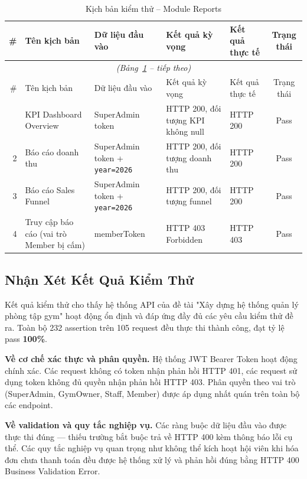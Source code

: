 \begin{longtable}{r p{3.2cm} p{2.8cm} p{2.8cm} p{2cm} c}
\caption{Kịch bản kiểm thử – Module Reports}
\label{tab:tc-reports} \\
\toprule
\# & Tên kịch bản & Dữ liệu đầu vào & Kết quả kỳ vọng & Kết quả thực tế & Trạng thái \\
\midrule
\endfirsthead
\multicolumn{6}{c}{\textit{(Bảng~\ref{tab:tc-reports} – tiếp theo)}} \\ \toprule
\# & Tên kịch bản & Dữ liệu đầu vào & Kết quả kỳ vọng & Kết quả thực tế & Trạng thái \\ \midrule
\endhead \midrule \endfoot \bottomrule \endlastfoot
1 & KPI Dashboard Overview                & SuperAdmin token                     & HTTP 200, đối tượng KPI không null  & HTTP 200 & Pass \\
2 & Báo cáo doanh thu                     & SuperAdmin token + \texttt{year=2026} & HTTP 200, đối tượng doanh thu      & HTTP 200 & Pass \\
3 & Báo cáo Sales Funnel                  & SuperAdmin token + \texttt{year=2026} & HTTP 200, đối tượng funnel         & HTTP 200 & Pass \\
4 & Truy cập báo cáo (vai trò Member bị cấm) & memberToken                       & HTTP 403 Forbidden                  & HTTP 403 & Pass \\
\end{longtable}

\subsection{Nhận Xét Kết Quả Kiểm Thử}

Kết quả kiểm thử cho thấy hệ thống API của đề tài "Xây dựng hệ thống quản lý phòng tập gym" hoạt động ổn định và đáp ứng đầy đủ các yêu cầu kiểm thử đề ra. Toàn bộ 232 assertion trên 105 request đều thực thi thành công, đạt tỷ lệ pass \textbf{100\%}.

\textbf{Về cơ chế xác thực và phân quyền.} Hệ thống JWT Bearer Token hoạt động chính xác. Các request không có token nhận phản hồi HTTP 401, các request sử dụng token không đủ quyền nhận phản hồi HTTP 403. Phân quyền theo vai trò (SuperAdmin, GymOwner, Staff, Member) được áp dụng nhất quán trên toàn bộ các endpoint.

\textbf{Về validation và quy tắc nghiệp vụ.} Các ràng buộc dữ liệu đầu vào được thực thi đúng — thiếu trường bắt buộc trả về HTTP 400 kèm thông báo lỗi cụ thể. Các quy tắc nghiệp vụ quan trọng như không thể kích hoạt hội viên khi hóa đơn chưa thanh toán đều được hệ thống xử lý và phản hồi đúng bằng HTTP 400 Business Validation Error.

